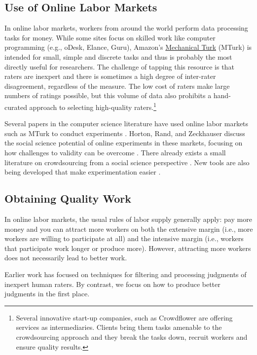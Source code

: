\documentclass{chi2009}
\begin{document}
{\subsection{Use of Online Labor Markets}
In online labor markets, workers from around the world perform data
processing tasks for money. While some sites focus on skilled work
like computer programming (e.g., oDesk, Elance, Guru), Amazon's
\href{https://www.mturk.com/mturk/welcome}{Mechanical Turk} (MTurk) is
intended for small, simple and discrete tasks and thus is probably the
most directly useful for researchers. The challenge of tapping this
resource is that raters are inexpert and there is sometimes a high
degree of inter-rater disagreement, regardless of the measure.  The
low cost of raters make large numbers of ratings possible, but this
volume of data also prohibits a hand-curated approach to selecting
high-quality raters.\footnote{Several innovative start-up companies,
  such as Crowdflower are offering services as intermediaries. Clients
  bring them tasks amenable to the crowdsourcing approach and they
  break the tasks down, recruit workers and ensure quality results.}

Several papers in the computer science literature have used online
labor markets such as MTurk to conduct experiments
\cite{kittur2008crowdsourcing, snow2008cheap, sheng2008get}. Horton,
Rand, and Zeckhauser discuss the social science potential of online
experiments in these markets, focusing on how challenges to validity
can be overcome \cite{hortonZeck2010}. There already exists a small
literature on crowdsourcing from a social science perspective
\cite{huberman-crowdsourcing, mason2009fip, horton2010labor,
  chen2009}. New tools are also being developed that make
experimentation easier \cite{little-turkit}.

\subsection{Obtaining Quality Work} 
In online labor markets, the usual rules of labor supply generally
apply: pay more money and you can attract more workers on both the
extensive margin (i.e., more workers are willing to participate at all) and the 
intensive margin (i.e., workers that participate work longer or produce more). However, attracting more workers does
not necessarily lead to better work. 

Earlier work \cite{von2004labeling, ipeirotis2010, snow2008cheap,
  Hopkins-King2010, downs2010your} has focused on techniques for filtering and
processing judgments of inexpert human raters. By contrast, we focus
on how to produce better judgments in the first place.

}
\end{document}
